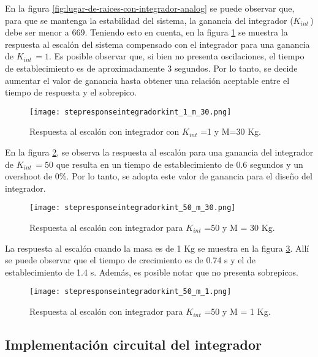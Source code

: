 \noindent En la figura \ref{fig:lugar-de-raices-con-integrador-analog} se puede observar que, para que se mantenga la estabilidad del sistema, la ganancia del integrador ($K_{int\ }$) debe ser menor a 669. Teniendo esto en cuenta, en la figura \ref{fig:respuesta-al-escalon-con-k-1-M-30-analog} se muestra la respuesta al escal\'{o}n del sistema compensado con el integrador para una ganancia de $K_{int\ }=1$.  Es posible observar que, si bien no presenta oscilaciones, el tiempo de establecimiento es de aproximadamente 3 segundos. Por lo tanto, se decide aumentar el valor de ganancia hasta obtener una relaci\'{o}n aceptable entre el tiempo de respuesta y el sobrepico.

\begin{figure}[H]
	\centering
	\texttt{[image: stepresponseintegradorkint\_1\_m\_30.png]}
	\caption{Respuesta al escalón con integrador con $K_{int}$ =1 y M=30 Kg.}
	\label{fig:respuesta-al-escalon-con-k-1-M-30-analog}
\end{figure}

\noindent En la figura \ref{fig:respuesta-al-escalon-con-k-50-M-30}, se observa la respuesta al escal\'{o}n para una ganancia del integrador de $K_{int\ }=50$ que resulta en un tiempo de establecimiento de 0.6 segundos y un overshoot de 0\%. Por lo tanto, se adopta este valor de ganancia para el dise\~{n}o del integrador.

\begin{figure}[H]
	\centering
	\texttt{[image: stepresponseintegradorkint\_50\_m\_30.png]}
	\caption{Respuesta al escalón con integrador para $K_{int}$ =50 y M = 30 Kg.}
	\label{fig:respuesta-al-escalon-con-k-50-M-30}
\end{figure}

\noindent La respuesta al escal\'{o}n cuando la masa es de 1 Kg se muestra en la figura \ref{fig:respuesta-al-escalon-con-k-50-M-1}. All\'{i} se puede observar que el tiempo de crecimiento es de 0.74 s y el de establecimiento de 1.4 s. Adem\'{a}s, es posible notar que no presenta sobrepicos.

\begin{figure}[H]
	\centering
	\texttt{[image: stepresponseintegradorkint\_50\_m\_1.png]}
	\caption{Respuesta al escalón con integrador para $K_{int}$ =50 y M = 1 Kg.}
	\label{fig:respuesta-al-escalon-con-k-50-M-1}
\end{figure}



\subsection{Implementación circuital del integrador}

